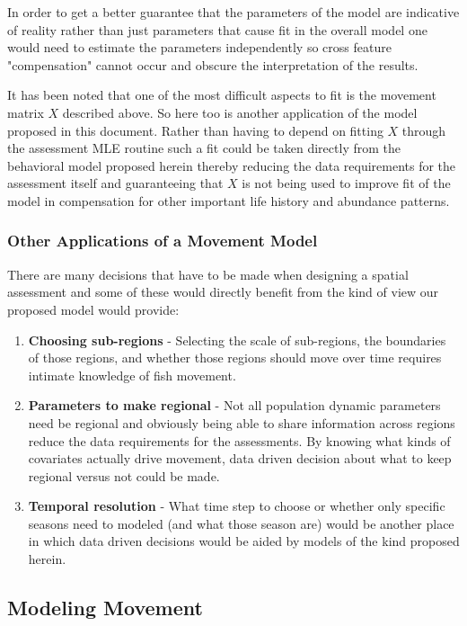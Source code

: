 \documentclass[11pt]{article}
\begin{document}
In order to get a better guarantee that the parameters of the model are indicative of reality rather than just parameters that cause fit in the overall model one would need to estimate the parameters independently so cross feature "compensation" cannot occur and obscure the interpretation of the results. 

It has been noted that one of the most difficult aspects to fit is the movement matrix $X$ described above. So here too is another application of the model proposed in this document. Rather than having to depend on fitting $X$ through the assessment MLE routine such a fit could be taken directly from the behavioral model proposed herein thereby reducing the data requirements for the assessment itself and guaranteeing that $X$ is not being used to improve fit of the model in compensation for other important life history and abundance patterns. 

\subsubsection{Other Applications of a Movement Model}

There are many decisions that have to be made when designing a spatial assessment and some of these would directly benefit from the kind of view our proposed model would provide:

\begin{enumerate}
\item \textbf{Choosing sub-regions} - Selecting the scale of sub-regions, the boundaries of those regions, and whether those regions should move over time requires intimate knowledge of fish movement.
\item \textbf{Parameters to make regional} - Not all population dynamic parameters need be regional and obviously being able to share information across regions reduce the data requirements for the assessments. By knowing what kinds of covariates actually drive movement, data driven decision about what to keep regional versus not could be made.
\item \textbf{Temporal resolution} - What time step to choose or whether only specific seasons need to modeled (and what those season are) would be another place in which data driven decisions would be aided by models of the kind proposed herein. 
\end{enumerate}

\newpage


\subsection{Modeling Movement}
\end{document}
